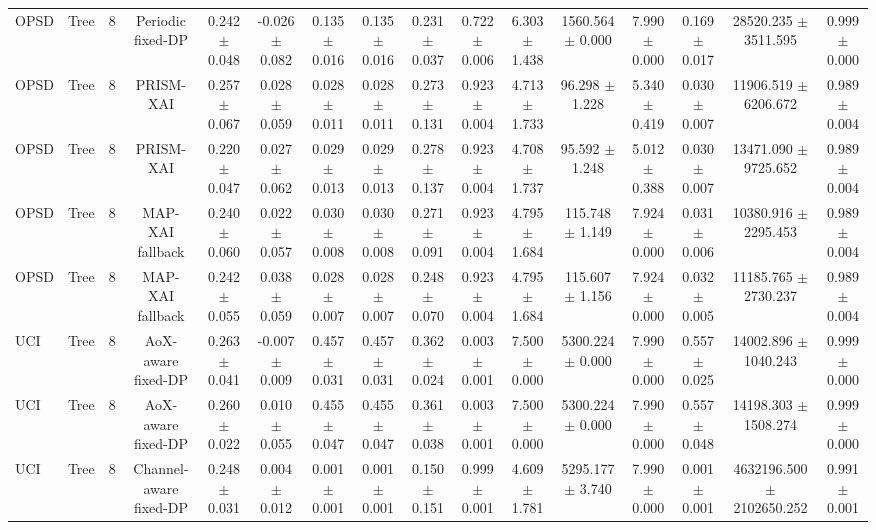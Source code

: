 \begin{tabular}{lccccccccccccccc}
OPSD & Tree & 8 & Periodic fixed-DP & 0.242 $\pm$ 0.048 & -0.026 $\pm$ 0.082 & 0.135 $\pm$ 0.016 & 0.135 $\pm$ 0.016 & 0.231 $\pm$ 0.037 & 0.722 $\pm$ 0.006 & 6.303 $\pm$ 1.438 & 1560.564 $\pm$ 0.000 & 7.990 $\pm$ 0.000 & 0.169 $\pm$ 0.017 & 28520.235 $\pm$ 3511.595 & 0.999 $\pm$ 0.000 \\
OPSD & Tree & 8 & PRISM-XAI & 0.257 $\pm$ 0.067 & 0.028 $\pm$ 0.059 & 0.028 $\pm$ 0.011 & 0.028 $\pm$ 0.011 & 0.273 $\pm$ 0.131 & 0.923 $\pm$ 0.004 & 4.713 $\pm$ 1.733 & 96.298 $\pm$ 1.228 & 5.340 $\pm$ 0.419 & 0.030 $\pm$ 0.007 & 11906.519 $\pm$ 6206.672 & 0.989 $\pm$ 0.004 \\
OPSD & Tree & 8 & PRISM-XAI & 0.220 $\pm$ 0.047 & 0.027 $\pm$ 0.062 & 0.029 $\pm$ 0.013 & 0.029 $\pm$ 0.013 & 0.278 $\pm$ 0.137 & 0.923 $\pm$ 0.004 & 4.708 $\pm$ 1.737 & 95.592 $\pm$ 1.248 & 5.012 $\pm$ 0.388 & 0.030 $\pm$ 0.007 & 13471.090 $\pm$ 9725.652 & 0.989 $\pm$ 0.004 \\
OPSD & Tree & 8 & MAP-XAI fallback & 0.240 $\pm$ 0.060 & 0.022 $\pm$ 0.057 & 0.030 $\pm$ 0.008 & 0.030 $\pm$ 0.008 & 0.271 $\pm$ 0.091 & 0.923 $\pm$ 0.004 & 4.795 $\pm$ 1.684 & 115.748 $\pm$ 1.149 & 7.924 $\pm$ 0.000 & 0.031 $\pm$ 0.006 & 10380.916 $\pm$ 2295.453 & 0.989 $\pm$ 0.004 \\
OPSD & Tree & 8 & MAP-XAI fallback & 0.242 $\pm$ 0.055 & 0.038 $\pm$ 0.059 & 0.028 $\pm$ 0.007 & 0.028 $\pm$ 0.007 & 0.248 $\pm$ 0.070 & 0.923 $\pm$ 0.004 & 4.795 $\pm$ 1.684 & 115.607 $\pm$ 1.156 & 7.924 $\pm$ 0.000 & 0.032 $\pm$ 0.005 & 11185.765 $\pm$ 2730.237 & 0.989 $\pm$ 0.004 \\
UCI & Tree & 8 & AoX-aware fixed-DP & 0.263 $\pm$ 0.041 & -0.007 $\pm$ 0.009 & 0.457 $\pm$ 0.031 & 0.457 $\pm$ 0.031 & 0.362 $\pm$ 0.024 & 0.003 $\pm$ 0.001 & 7.500 $\pm$ 0.000 & 5300.224 $\pm$ 0.000 & 7.990 $\pm$ 0.000 & 0.557 $\pm$ 0.025 & 14002.896 $\pm$ 1040.243 & 0.999 $\pm$ 0.000 \\
UCI & Tree & 8 & AoX-aware fixed-DP & 0.260 $\pm$ 0.022 & 0.010 $\pm$ 0.055 & 0.455 $\pm$ 0.047 & 0.455 $\pm$ 0.047 & 0.361 $\pm$ 0.038 & 0.003 $\pm$ 0.001 & 7.500 $\pm$ 0.000 & 5300.224 $\pm$ 0.000 & 7.990 $\pm$ 0.000 & 0.557 $\pm$ 0.048 & 14198.303 $\pm$ 1508.274 & 0.999 $\pm$ 0.000 \\
UCI & Tree & 8 & Channel-aware fixed-DP & 0.248 $\pm$ 0.031 & 0.004 $\pm$ 0.012 & 0.001 $\pm$ 0.001 & 0.001 $\pm$ 0.001 & 0.150 $\pm$ 0.151 & 0.999 $\pm$ 0.001 & 4.609 $\pm$ 1.781 & 5295.177 $\pm$ 3.740 & 7.990 $\pm$ 0.000 & 0.001 $\pm$ 0.001 & 4632196.500 $\pm$ 2102650.252 & 0.991 $\pm$ 0.001 \\

\end{tabular}
